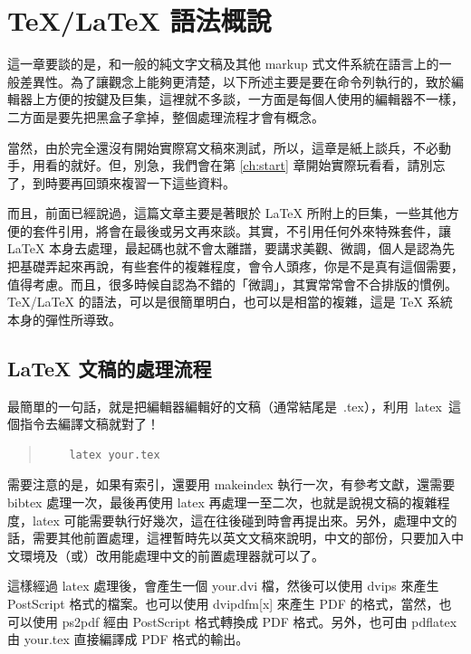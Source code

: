 
\chapter{\TeX{}/\LaTeX{} 語法概說}
\label{ch:syntax}

這一章要談的是，和一般的純文字文稿及其他 markup 式文件系統在語言上的一般差異性。為了讓觀念上能夠更清楚，以下所述主要是要在命令列執行的，致於編輯器上方便的按鍵及巨集，這裡就不多談，一方面是每個人使用的編輯器不一樣，二方面是要先把黑盒子拿掉，整個處理流程才會有概念。

當然，由於完全還沒有開始實際寫文稿來測試，所以，這章是紙上談兵，不必動手，用看的就好。但，別急，我們會在第 \ref{ch:start} 章開始實際玩看看，請別忘了，到時要再回頭來複習一下這些資料。

而且，前面已經說過，這篇文章主要是著眼於 \LaTeX{} 所附上的巨集，一些其他方便的套件引用，將會在最後或另文再來談。其實，不引用任何外來特殊套件，讓 \LaTeX{} 本身去處理，最起碼也就不會太離譜，要講求美觀、微調，個人是認為先把基礎弄起來再說，有些套件的複雜程度，會令人頭疼，你是不是真有這個需要，值得考慮。而且，很多時候自認為不錯的「微調」，其實常常會不合排版的慣例。\TeX{}/\LaTeX{} 的語法，可以是很簡單明白，也可以是相當的複雜，這是 \TeX{} 系統本身的彈性所導致。

\section{\LaTeX{} 文稿的處理流程}

最簡單的一句話，就是把編輯器編輯好的文稿（通常結尾是~{\ttfamily .tex}），利用~{\ttfamily latex}~這個指令去編譯文稿就對了！

\begin{quote}
   \begin{verbatim}
    latex your.tex
  \end{verbatim}
\end{quote}

需要注意的是，如果有索引，還要用 {\ttfamily makeindex} 執行一次，有參考文獻，還需要 {\ttfamily bibtex} 處理一次，最後再使用 {\ttfamily latex} 再處理一至二次，也就是說視文稿的複雜程度，{\ttfamily latex} 可能需要執行好幾次，這在往後碰到時會再提出來。另外，處理中文的話，需要其他前置處理，這裡暫時先以英文文稿來說明，中文的部份，只要加入中文環境及（或）改用能處理中文的前置處理器就可以了。

這樣經過 {\ttfamily latex} 處理後，會產生一個 {\ttfamily your.dvi} 檔，然後可以使用 {\ttfamily dvips} 來產生 {\sc PostScript} 格式的檔案。也可以使用 {\ttfamily dvipdfm[x]} 來產生 PDF 的格式，當然，也可以使用 {\ttfamily ps2pdf} 經由 {\sc PostScript} 格式轉換成 PDF 格式。另外，也可由 {\ttfamily pdflatex} 由 {\ttfamily your.tex} 直接編譯成 PDF 格式的輸出。

